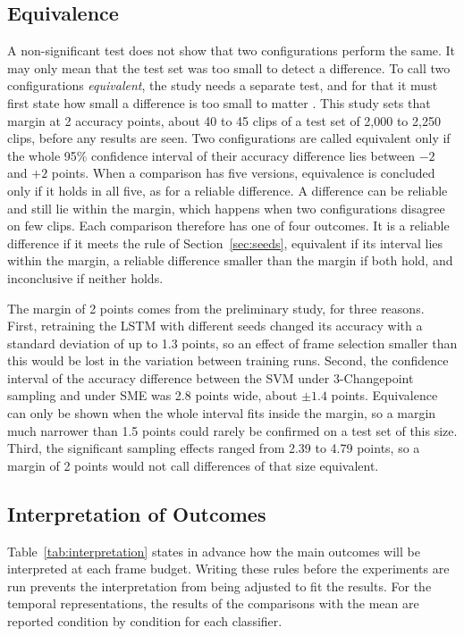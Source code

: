 \subsection{Equivalence}

A non-significant test does not show that two configurations perform the same. It may only mean that the test set was too small to detect a difference. To call two configurations \emph{equivalent}, the study needs a separate test, and for that it must first state how small a difference is too small to matter \cite{lakens2017}. This study sets that margin at 2 accuracy points, about 40 to 45 clips of a test set of 2,000 to 2,250 clips, before any results are seen. Two configurations are called equivalent only if the whole 95\% confidence interval of their accuracy difference lies between $-2$ and $+2$ points. When a comparison has five versions, equivalence is concluded only if it holds in all five, as for a reliable difference. A difference can be reliable and still lie within the margin, which happens when two configurations disagree on few clips. Each comparison therefore has one of four outcomes. It is a reliable difference if it meets the rule of Section~\ref{sec:seeds}, equivalent if its interval lies within the margin, a reliable difference smaller than the margin if both hold, and inconclusive if neither holds.

The margin of 2 points comes from the preliminary study, for three reasons. First, retraining the LSTM with different seeds changed its accuracy with a standard deviation of up to 1.3 points, so an effect of frame selection smaller than this would be lost in the variation between training runs. Second, the confidence interval of the accuracy difference between the SVM under 3-Changepoint sampling and under SME was 2.8 points wide, about $\pm 1.4$ points. Equivalence can only be shown when the whole interval fits inside the margin, so a margin much narrower than 1.5 points could rarely be confirmed on a test set of this size. Third, the significant sampling effects ranged from 2.39 to 4.79 points, so a margin of 2 points would not call differences of that size equivalent.

\subsection{Interpretation of Outcomes}

Table~\ref{tab:interpretation} states in advance how the main outcomes will be interpreted at each frame budget. Writing these rules before the experiments are run prevents the interpretation from being adjusted to fit the results. For the temporal representations, the results of the comparisons with the mean are reported condition by condition for each classifier.

